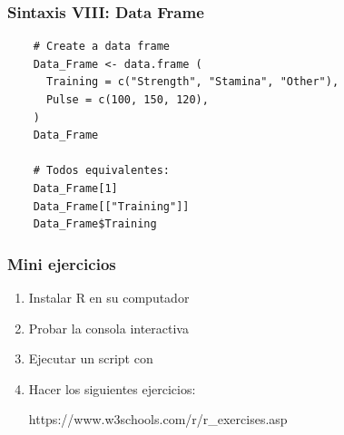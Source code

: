 \documentclass[14pt,aspectratio=169,xcolor=dvipsnames]{beamer}
\begin{document}
\begin{frame}[fragile]\frametitle{Sintaxis VIII: Data Frame}
    \begin{verbatim}
    # Create a data frame
    Data_Frame <- data.frame (
      Training = c("Strength", "Stamina", "Other"),
      Pulse = c(100, 150, 120),
    )
    Data_Frame 

    # Todos equivalentes: 
    Data_Frame[1]
    Data_Frame[["Training"]]
    Data_Frame$Training 
    \end{verbatim}
\end{frame}
\begin{frame}
    \maketitle
\end{frame}
\begin{frame}[noframenumbering]\frametitle{Mini ejercicios}
    \begin{enumerate}
        \item Instalar R en su computador 
        \item Probar la consola interactiva
        \item Ejecutar un script con 
        \item Hacer los siguientes ejercicios: 
            \begin{center}
                https://www.w3schools.com/r/r\_exercises.asp
            \end{center}
    \end{enumerate}
\end{frame}
\end{document}
